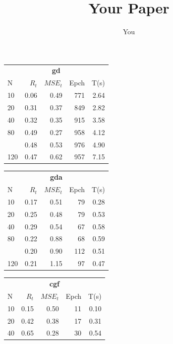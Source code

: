 \documentclass[a4paper, 10pt]{article}
\title{Your Paper}
\author{You}
\begin{document}
\maketitle
\newpage
\begin{table}[h!]
  \begin{tabular}{@{}lrrrr@{}}
    \toprule
    \multicolumn{5}{c}{\textbf{gd}} \\
    N  &   $R_t$  &  $MSE_t$ &  Epch  & T(s)\\
    \midrule
    10       &   0.06     &  0.49       &  771     & 2.64   \\
    20       &   0.31     &  0.37       &  849     & 2.82   \\
    40       &   0.32     &  0.35       &  915     & 3.58   \\
    80       &   0.49     &  0.27       &  958     & 4.12   \\
    \hdashline
    100      &   0.48     &  0.53       &  976     & 4.90   \\
    120      &   0.47     &  0.62       &  957     & 7.15   \\
    \bottomrule
  \end{tabular} 
  \hfill
  \begin{tabular}{@{}lrrrr@{}}
    \toprule
    \multicolumn{5}{c}{\textbf{gda}} \\
    N  &   $R_t$  &  $MSE_t$ &  Epch  & T(s)\\
    \midrule
    10  & 0.17    & 0.51    & 79      &  0.28   \\
    20  & 0.25    & 0.48    & 79      &  0.53   \\
    40  & 0.29    & 0.54    & 67      &  0.58   \\
    80  & 0.22    & 0.88    & 68      &  0.59   \\                 
    \hdashline
    100 & 0.20    & 0.90    & 112     &  0.51   \\
    120 & 0.21    & 1.15    & 97      &  0.47   \\
    \bottomrule
  \end{tabular} 
  \hfill
  \begin{tabular}{@{}lrrrr@{}}
    \toprule
    \multicolumn{5}{c}{\textbf{cgf}} \\
    N  &   $R_t$  &  $MSE_t$ &  Epch  & T(s)\\
    \midrule
    10  & 0.15    & 0.50    & 11      &  0.10  \\
    20  & 0.42    & 0.38    & 17      &  0.31  \\
    40  & 0.65    & 0.28    & 30      &  0.54  \\

\end{tabular}
\end{table}
\end{document}

